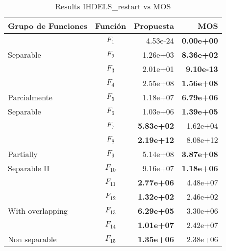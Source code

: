 \begin{table}
  \centering
  \caption{Results IHDELS\_restart vs MOS}
    \begin{tabular}{lcrr}
\toprule
Grupo de Funciones & Función & Propuesta & MOS\\
\midrule
                   & $F_1$    & 4.53e-24           & \textbf{0.00e+00}\\
Separable         & $F_2$    & 1.26e+03           & \textbf{8.36e+02}\\
                   & $F_3$    & 2.01e+01           & \textbf{9.10e-13}\\
\midrule
                   & $F_4$    & 2.55e+08           & \textbf{1.56e+08}\\
Parcialmente       & $F_5$    & 1.18e+07           & \textbf{6.79e+06}\\
Separable         & $F_6$    & 1.03e+06           & \textbf{1.39e+05}\\
                   & $F_7$    & \textbf{5.83e+02}  & 1.62e+04\\
\midrule
                   & $F_8$    & \textbf{2.19e+12}  & 8.08e+12\\
Partially & $F_{9}$  & 5.14e+08           & \textbf{3.87e+08}\\
Separable II      & $F_{10}$ & 9.16e+07           & \textbf{1.18e+06}\\
                   & $F_{11}$ & \textbf{2.77e+06}  & 4.48e+07\\
\midrule
                   & $F_{12}$ & \textbf{1.32e+02 } & 2.46e+02\\
With overlapping & $F_{13}$ & \textbf{6.29e+05}  & 3.30e+06\\
                   & $F_{14}$ & \textbf{1.01e+07}  & 2.42e+07\\
\midrule
Non separable       & $F_{15}$ & \textbf{1.35e+06}  & 2.38e+06\\
\bottomrule
\end{tabular}
\end{table}
